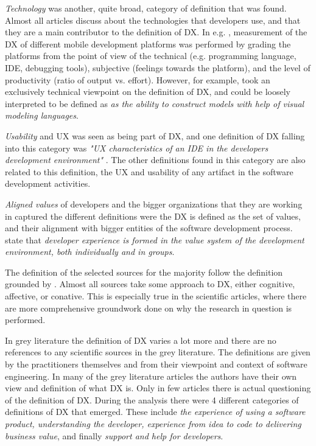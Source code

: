 \documentclass[english, 12pt, a4paper, sci, utf8, a-1b, online]{aaltothesis}
\newcounter{subsubsubsection}[subsubsection]
\begin{document}
\noindent \textit{Technology} was another, quite broad, category of definition that was found.  Almost all articles discuss about the technologies that developers use, and that they are a main contributor to the definition of DX. In e.g. \textcite{nebeling2013informing}, measurement of the DX of different mobile development platforms was performed by grading the platforms from the point of view of the technical (e.g. programming language, IDE, debugging tools), subjective (feelings towards the platform), and the level of productivity (ratio of output vs. effort). However, for example, \textcite{silva-comparing} took an exclusively technical viewpoint on the definition of DX, and could be loosely interpreted to be defined as \textit{as the ability to construct models with help of visual modeling languages}.

\textit{Usability} and UX was seen as being part of DX, and one definition of DX falling into this category was \textit{"UX characteristics of an IDE in the developers development environment"} \parencite{software-developers-as-users}. The other definitions found in this category are also related to this definition, the UX and usability of any artifact in the software development activities.

\textit{Aligned values} of developers and the bigger organizations that they are working in captured the different definitions were the DX is defined as the set of values, and their alignment with bigger entities of the software development process. \parencite{fagerholm2014examining} state that \textit{developer experience is formed in the value system of the development environment, both individually and in groups}.

The definition of the selected sources for the majority follow the definition grounded by \textcite{fagerholm-doctoral-thesis}. Almost all sources take some approach to DX, either cognitive, affective, or conative. This is especially true in the scientific articles, where there are more comprehensive groundwork done on why the research in question is performed.


In grey literature the definition of DX varies a lot more and there are no references to any scientific sources in the grey literature. The definitions are given by the practitioners themselves and from their viewpoint and context of software engineering. In many of the grey literature articles the authors have their own view and definition of what DX is. Only in few articles there is actual questioning of the definition of DX. During the analysis there were 4 different categories of definitions of DX that emerged. These include \textit{the experience of using a software product, understanding the developer, experience from idea to code to delivering business value}, and finally \textit{support and help for developers}.
\end{document}
